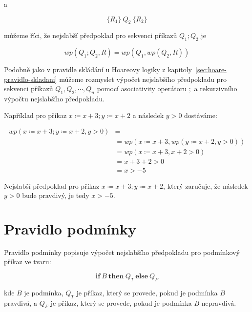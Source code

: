 a

\begin{equation*}
    \{ R_1 \} \  Q_2 \  \{ R_2 \}
\end{equation*}

můžeme říci, že nejslabší předpoklad pro sekvenci příkazů $Q_1; Q_2$ je

\begin{equation*}
    wp(Q_1; Q_2, R) = wp(Q_1, wp(Q_2, R))
\end{equation*}

Podobně jako v pravidle skládání u Hoareovy logiky z kapitoly~\ref{sec:hoare-pravidlo-skladani}
můžeme rozmyslet výpočet nejslabšího předpokladu pro sekvenci příkazů $Q_1, Q_2, \cdots, Q_n$
pomocí asociativity operátoru $;$ a rekurzivního výpočtu nejslabšího předpokladu.

Například pro příkaz $x \coloneqq x + 3; y \coloneqq x + 2$ a následek $y > 0$ dostáváme:

\begin{align*}
    wp(x \coloneqq x + 3; y \coloneqq x + 2, y > 0) & = \\
                                                     & = wp(x \coloneqq x + 3, wp(y \coloneqq x + 2, y > 0)) \\
                                                     & = wp(x \coloneqq x + 3, x + 2 > 0) \\
                                                     & = x + 3 + 2 > 0 \\
                                                     & = x > -5
\end{align*}

Nejslabší předpoklad pro příkaz $x \coloneqq x + 3; y \coloneqq x + 2$, který zaručuje, že
následek $y > 0$ bude pravdivý, je tedy $x > -5$.

\section{Pravidlo podmínky}
\label{sec:pravidlo-podminky}

Pravidlo podmínky popisuje výpočet nejslabšího předpokladu pro podmínkový příkaz ve tvaru:

\begin{equation*}
    \textbf{if} \ B \ \textbf{then} \ Q_T \ \textbf{else} \ Q_F
\end{equation*}

kde $B$ je podmínka, $Q_T$ je příkaz, který se provede, pokud je podmínka $B$ pravdivá,
a $Q_F$ je příkaz, který se provede, pokud je podmínka $B$ nepravdivá.

